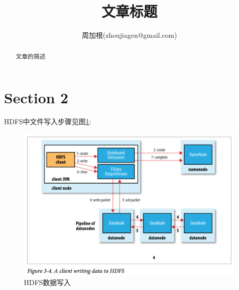 \documentclass{article}
\title{文章标题}
\author{周加根(zhoujiagen@gmail.com)}
\begin{document}
\setlength{\parskip}{0.5em}

\maketitle

\renewcommand\abstractname{简述}
\begin{abstract}
\setlength{\parskip}{0.5em}
文章的简述
\end{abstract}

\newpage

\renewcommand\contentsname{目录}
\tableofcontents

\newpage



\section{Section 2}


\cite{frontiers-mda}


HDFS中文件写入步骤见图\ref{fig:hdfs-write-data}:

\begin{figure}
\centering
\includegraphics[scale=0.5]{image/hdfs-write-data.png}
\caption{HDFS数据写入}\label{fig:hdfs-write-data}
\end{figure}


\newpage
\renewcommand\refname{参考文献}


\newpage
\renewcommand\indexname{索引}
\printindex
\end{document}
